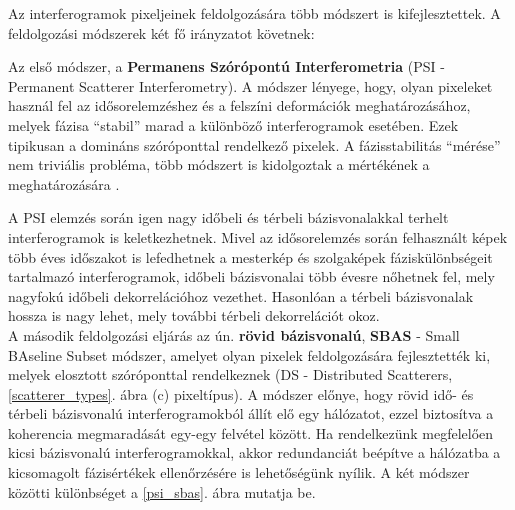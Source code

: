 \documentclass[12pt]{report}
\numberwithin{equation}{section}
\numberwithin{table}{section}
\numberwithin{figure}{section}
\begin{document}
Az interferogramok pixeljeinek feldolgozására több módszert is kifejlesztettek. \cite{Ferretti2011, Hooper2008, Ferretti2001, Lanari2002} A feldolgozási módszerek két fő irányzatot követnek:

Az első módszer, a \textbf{Permanens Szórópontú Interferometria} (PSI - Permanent Scatterer Interferometry). A módszer lényege, hogy, olyan pixeleket használ fel az idősorelemzéshez és a felszíni deformációk meghatározásához, melyek fázisa ``stabil'' marad a különböző interferogramok esetében. Ezek tipikusan a domináns szóróponttal rendelkező pixelek. A fázisstabilitás ``mérése'' nem triviális probléma, több módszert is kidolgoztak a mértékének a meghatározására \cite{Ferretti2001, Hooper2008}.

A PSI elemzés során igen nagy időbeli és térbeli bázisvonalakkal terhelt interferogramok is keletkezhetnek. Mivel az idősorelemzés során felhasznált képek több éves időszakot is lefedhetnek a mesterkép és szolgaképek fáziskülönbségeit tartalmazó interferogramok, időbeli bázisvonalai több évesre nőhetnek fel, mely nagyfokú időbeli dekorrelációhoz vezethet. Hasonlóan a térbeli bázisvonalak hossza is nagy lehet, mely további térbeli dekorrelációt okoz.\\[15pt]
A második feldolgozási eljárás az ún. \textbf{rövid bázisvonalú}, \textbf{SBAS} - Small BAseline Subset módszer, amelyet olyan pixelek feldolgozására fejlesztették ki, melyek elosztott szóróponttal rendelkeznek \cite{Ferretti2011} (DS - Distributed Scatterers, \ref{scatterer_types}. ábra (c) pixeltípus). A módszer előnye, hogy rövid idő- és térbeli bázisvonalú interferogramokból állít elő egy hálózatot, ezzel biztosítva a koherencia megmaradását egy-egy felvétel között. Ha rendelkezünk megfelelően kicsi bázisvonalú interferogramokkal, akkor redundanciát beépítve a hálózatba a kicsomagolt fázisértékek ellenőrzésére is lehetőségünk nyílik. A két módszer közötti különbséget a \ref{psi_sbas}. ábra mutatja be.
\end{document}

